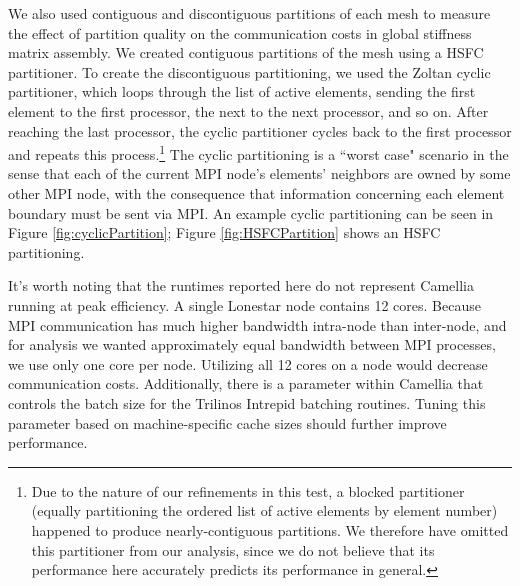 We also used contiguous and discontiguous partitions of each mesh to measure the effect of partition quality on the communication costs in global stiffness matrix assembly.  We created contiguous partitions of the mesh using a HSFC partitioner.  To create the discontiguous partitioning, we used the Zoltan cyclic partitioner, which loops through the list of active elements, sending the first element to the first processor, the next to the next processor, and so on.  After reaching the last processor, the cyclic partitioner cycles back to the first processor and repeats this process.\footnote{Due to the nature of our refinements in this test, a blocked partitioner (equally partitioning the ordered list of active elements by element number) happened to produce nearly-contiguous partitions.  We therefore have omitted this partitioner from our analysis, since we do not believe that its performance here accurately predicts its performance in general.}  The cyclic partitioning is a ``worst case" scenario in the sense that each of the current MPI node's elements' neighbors are owned by some other MPI node, with the consequence that information concerning each element boundary must be sent via MPI.  An example cyclic partitioning can be seen in Figure \ref{fig:cyclicPartition}; Figure \ref{fig:HSFCPartition} shows an HSFC partitioning.

It's worth noting that the runtimes reported here do not represent Camellia running at peak efficiency.  A single Lonestar node contains 12 cores.  Because MPI communication has much higher bandwidth intra-node than inter-node, and for analysis we wanted approximately equal bandwidth between MPI processes, we use only one core per node.  Utilizing all 12 cores on a node would decrease communication costs.  Additionally, there is a parameter within Camellia that controls the batch size for the Trilinos Intrepid batching routines.  Tuning this parameter based on machine-specific cache sizes should further improve performance.

